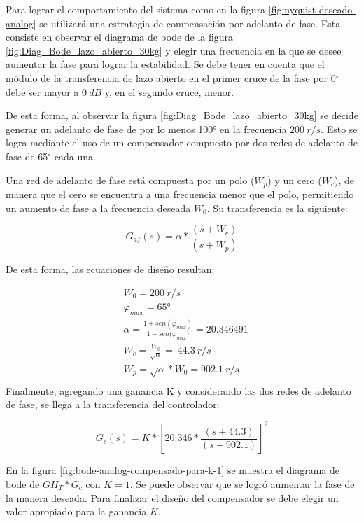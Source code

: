 Para lograr el comportamiento del sistema como en la figura 	\ref{fig:nyquist-deseado-analog} se utilizará una estrategia de compensación por adelanto de fase. Esta consiste en observar el diagrama de bode de la figura \ref{fig:Diag_Bode_lazo_abierto_30kg} y elegir una frecuencia en la que se desee aumentar la fase para lograr la estabilidad. Se debe tener en cuenta que el módulo de la transferencia de lazo abierto en el primer cruce de la fase por 0$\mathrm{{}^\circ}$ debe ser mayor a $0\:dB$ y, en el segundo cruce, menor. 

De esta forma, al observar la figura \ref{fig:Diag_Bode_lazo_abierto_30kg} se decide generar un adelanto de fase de por lo menos 100° en la frecuencia $200\:r/s$. Esto se logra mediante el uso de un compensador compuesto por dos redes de adelanto de fase de 65$\mathrm{{}^\circ}$ cada una. 

Una red de adelanto de fase está compuesta por un polo ($W_p$) y un cero ($W_c$), de manera que el cero se encuentra a una frecuencia menor que el polo, permitiendo un aumento de fase a la frecuencia deseada $W_0$. Su transferencia es la siguiente:

\begin{equation}
	G_{af}(s)=\alpha*\frac{(s + W_c)}{(s + W_p)}
\end{equation}

\noindent De esta forma, las ecuaciones de dise\~{n}o resultan:

\begin{equation*}
	\begin{aligned}
		&W_0 =200\:r/s\\
		&{\varphi }_{max} =65\textrm{°}\\
		&\alpha =\frac{1+sen({\varphi }_{max})}{1-sen{(\varphi }_{max})}=20.346491\\
		&W_c =\frac{W_0}{\sqrt{\alpha }}=\ 44.3\:r/s\\
		&W_p =\sqrt{\alpha }*W_0=902.1\: r/s\\
	\end{aligned}
\end{equation*} 
\noindent Finalmente, agregando una ganancia K y considerando las dos redes de adelanto de fase, se llega a la transferencia del controlador:

\begin{equation}  
	G_c(s)=K*{[20.346*\frac{(s+44.3)}{(s+902.1)}]}^2
\end{equation} 

\noindent En la figura \ref{fig:bode-analog-compensado-para-k-1} se muestra el diagrama de bode de ${GH}_T*G_c$ con $K=1$. Se puede observar que se logró aumentar la fase de la manera deseada. Para finalizar el diseño del compensador se debe elegir un valor apropiado para la ganancia $K$.

